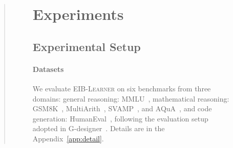 \documentclass[11pt]{article}
\newcommand{\ourmethod}{\textsc{{EIB-Learner}}\xspace}
\begin{document}
\begin{abstract}
\begin{figure}[ht!]

\section{Experiments}
\subsection{Experimental Setup}
\paragraph{Datasets} We evaluate \ourmethod on six benchmarks from three domains: general reasoning: MMLU~\cite{hendrycks2020measuring}, mathematical reasoning: GSM8K~\cite{cobbe2021training}, MultiArith~\cite{roy2016solving}, SVAMP~\cite{patel2021nlp}, and AQuA~\cite{ling2017program}, and code generation: HumanEval~\cite{chen2021evaluating}, following the evaluation setup adopted in G-designer~\cite{zhang2024g}. Details are in the Appendix~\ref{app:detail}.


\end{figure}
\end{abstract}
\end{document}
